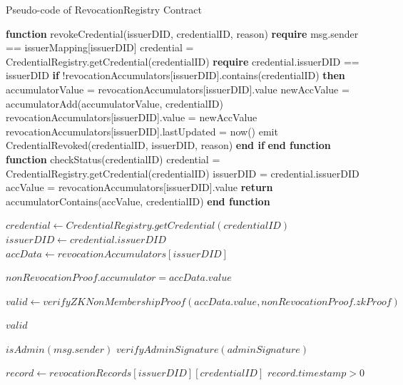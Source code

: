 \documentclass[lettersize,journal]{IEEEtran}
\begin{document}
\begin{algorithm}
\caption{Pseudo-code of RevocationRegistry Contract}
\label{alg:revocation_registry}
\begin{algorithmic}[1]
\STATE \textbf{function} revokeCredential(issuerDID, credentialID, reason)
\STATE \quad \textbf{require} msg.sender == issuerMapping[issuerDID]
\STATE \quad credential = CredentialRegistry.getCredential(credentialID)
\STATE \quad \textbf{require} credential.issuerDID == issuerDID
\STATE \quad \textbf{if} !revocationAccumulators[issuerDID].contains(credentialID) \textbf{then}
\STATE \quad \quad accumulatorValue = revocationAccumulators[issuerDID].value
\STATE \quad \quad newAccValue = accumulatorAdd(accumulatorValue, credentialID)
\STATE \quad \quad revocationAccumulators[issuerDID].value = newAccValue
\STATE \quad \quad revocationAccumulators[issuerDID].lastUpdated = now()
\STATE \quad \quad emit CredentialRevoked(credentialID, issuerDID, reason)
\STATE \quad \textbf{end if}
\STATE \textbf{end function}
\STATE
\STATE \textbf{function} checkStatus(credentialID)
\STATE \quad credential = CredentialRegistry.getCredential(credentialID)
\STATE \quad issuerDID = credential.issuerDID
\STATE \quad accValue = revocationAccumulators[issuerDID].value
\STATE \quad \textbf{return} accumulatorContains(accValue, credentialID)
\STATE \textbf{end function}

    \State $credential \gets CredentialRegistry.getCredential(credentialID)$
    \State $issuerDID \gets credential.issuerDID$
    \State $accData \gets revocationAccumulators[issuerDID]$
    
    \Require $nonRevocationProof.accumulator = accData.value$ 
    
    \State $valid \gets verifyZKNonMembershipProof(accData.value, nonRevocationProof.zkProof)$
    
    \RETURN $valid$
\EndProcedure
\Statex 

    \Require $isAdmin(msg.sender)$ 
    \Require $verifyAdminSignature(adminSignature)$ 
    
    \State $record \gets revocationRecords[issuerDID][credentialID]$
    \Require $record.timestamp > 0$ 
    

\end{algorithmic}
\end{algorithm}
\end{document}
